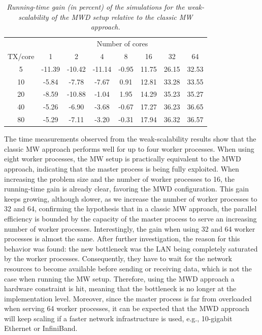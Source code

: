 \begin{table}
\centering

\caption{\textit{\emph{Running-time gain (in percent) of the simulations for
the weak-scalability of the MWD setup relative to the classic MW approach.\label{tab:04-Weak_scaling-time_gain}}}}


{\small{}}%
\begin{tabular}{cccccccc}
\cmidrule{2-8} 
 & \multicolumn{7}{c}{{\small{Number of cores}}}\tabularnewline\addlinespace
\midrule 
{\small{TX/core}} & {\small{1}} & {\small{2}} & {\small{4}} & {\small{8}} & {\small{16}} & {\small{32}} & {\small{64}}\tabularnewline
\midrule
{\small{5}} & {\small{-11.39}} & {\small{-10.42}} & {\small{-11.14}} & {\small{-0.95}} & {\small{11.75}} & {\small{26.15}} & {\small{32.53}}\tabularnewline
{\small{10}} & {\small{-5.84}} & {\small{-7.78}} & {\small{-7.67}} & {\small{0.91}} & {\small{12.81}} & {\small{33.28}} & {\small{33.55}}\tabularnewline
{\small{20}} & {\small{-8.59}} & {\small{-10.88}} & {\small{-1.04}} & {\small{1.95}} & {\small{14.29}} & {\small{35.23}} & {\small{35.27}}\tabularnewline
{\small{40}} & {\small{-5.26}} & {\small{-6.90}} & {\small{-3.68}} & {\small{-0.67}} & {\small{17.27}} & {\small{36.23}} & {\small{36.65}}\tabularnewline
{\small{80}} & {\small{-5.29}} & {\small{-7.11}} & {\small{-3.20}} & {\small{-0.31}} & {\small{17.94}} & {\small{36.32}} & {\small{36.57}}\tabularnewline
\bottomrule
\end{tabular}
\end{table}


The time measurements observed from the weak-scalability results show
that the classic MW approach performs well for up to four worker processes.
When using eight worker processes, the MW setup is practically equivalent
to the MWD approach, indicating that the master process is being fully
exploited. When increasing the problem size and the number of worker
processes to 16, the running-time gain is already clear, favoring
the MWD configuration. This gain keeps growing, although slower, as
we increase the number of worker processes to 32 and 64, confirming
the hypothesis that in a classic MW approach, the parallel efficiency
is bounded by the capacity of the master process to serve an increasing
number of worker processes. Interestingly, the gain when using 32
and 64 worker processes is almost the same. After further investigation,
the reason for this behavior was found: the new bottleneck was the
LAN being completely saturated by the worker processes. Consequently,
they have to wait for the network resources to become available before
sending or receiving data, which is not the case when running the
MW setup. Therefore, using the MWD approach a hardware constraint
is hit, meaning that the bottleneck is no longer at the implementation
level. Moreover, since the master process is far from overloaded when
serving 64 worker processes, it can be expected that the MWD approach
will keep scaling if a faster network infrastructure is used, e.g.,
10-gigabit Ethernet or InfiniBand.

